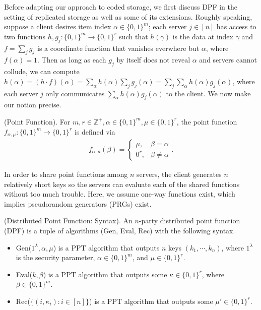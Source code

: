 \documentclass[11pt]{article}
\newcommand{\Gen}{\textsf{Gen}}
\newcommand{\Eval}{\textsf{Eval}}
\newcommand{\Rec}{\textsf{Rec}}
\begin{document}
Before adapting our approach to coded storage, we first discuss DPF in the setting of replicated storage as well as some of its extensions. Roughly speaking, suppose a client desires item index $\alpha \in \{0,1\}^m$; each server $j \in [n]$ has access to two functions $h,g_j : \{0,1\}^m \to \{0,1\}^r$ such that $h(\gamma)$ is the data at index $\gamma$ and $f = \sum_j g_j$ is a coordinate function that vanishes everwhere but $\alpha$, where $f(\alpha) = 1$. Then as long as each $g_j$ by itself does not reveal $\alpha$ and servers cannot collude, we can compute $h(\alpha) = (h \cdot f)(\alpha) = \sum_\alpha h(\alpha) \sum_j g_j(\alpha) = \sum_j \sum_\alpha h(\alpha)g_j(\alpha)$, where each server $j$ only communicates $\sum_\alpha h(\alpha)g_j(\alpha)$ to the client. We now make our notion precise.
\begin{definition}
(Point Function). For $m,r \in \mathbb{Z}^+, \alpha \in \{0,1\}^m, \mu \in \{0,1\}^r$, the point function $f_{\alpha, \mu} : \{0,1\}^m \to \{0,1\}^r$ is defined via
\begin{align*}
  f_{\alpha, \mu}(\beta) = \begin{cases}
  \mu, &\beta = \alpha\\
  0^r, &\beta \neq \alpha
  \end{cases}.
\end{align*}
\end{definition}
In order to share point functions among $n$ servers, the client generates $n$ relatively short keys so the servers can evaluate each of the shared functions without too much trouble. Here, we assume one-way functions exist, which implies pseudorandom generators (PRGs) exist.
\begin{definition}
(Distributed Point Function: Syntax). An $n$-party distributed point function (DPF) is a tuple of algorithms (\Gen, \Eval, \Rec) with the following syntax.
\begin{itemize}
  \item \Gen($1^\lambda, \alpha, \mu$) is a PPT algorithm that outputs $n$ keys $(k_1, \cdots, k_n)$, where $1^\lambda$ is the security parameter, $\alpha \in \{0,1\}^m$, and $\mu \in \{0,1\}^r$.
  \item \Eval($k, \beta$) is a PPT algorithm that outputs some $\kappa \in \{0,1\}^r$, where $\beta \in \{0,1\}^m$.
  \item \Rec($\{(i, \kappa_i) : i \in [n]\}$) is a PPT algorithm that outputs some $\mu' \in \{0,1\}^r$.
\end{itemize}
\end{definition}
\end{document}
